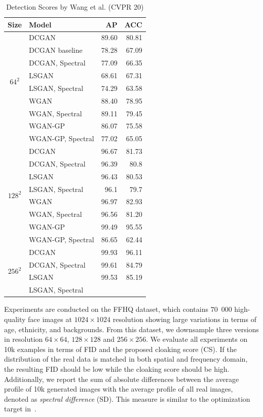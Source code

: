 \documentclass[letterpaper]{article} %
\begin{document}
\begin{table}
    \caption{Detection Scores by Wang et al. (CVPR 20)}
    \centering
    \begin{tabular}{l|l|rr}
        \toprule
        Size & Model & AP&ACC\\
        \midrule

\multicolumn{1}{c|}{\multirow{8}{*}{$64^2$}}
& DCGAN & 89.60&80.81 \\
& DCGAN baseline &78.28&67.09\\
  & DCGAN, Spectral &77.09&66.35\\
 \cline{2-4}
 & LSGAN &68.61&67.31 \\
 & LSGAN, Spectral &74.29&63.58 \\ %
 & WGAN & 88.40&78.95\\
 & WGAN, Spectral &  89.11&79.45\\ \cline{2-4}
 & WGAN-GP & 86.07&75.58\\
 & WGAN-GP, Spectral&77.02&65.05\\ \midrule
\multicolumn{1}{c|}{\multirow{8}{*}{$128^2$}} & DCGAN &96.67&81.73\\
 & DCGAN, Spectral & 96.39&80.8\\ \cline{2-4}
 & LSGAN & 96.43&80.53 \\
 & LSGAN, Spectral &96.1&79.7  \\ \cline{2-4}
 & WGAN &96.97&82.93  \\
 & WGAN, Spectral& 96.56&81.20\\ \cline{2-4}
 & WGAN-GP &99.49&95.55  \\
 & WGAN-GP, Spectral &86.65&62.44 \\\midrule
\multicolumn{1}{c|}{\multirow{4}{*}{$256^2$}} & DCGAN &99.93& 96.11\\
 & DCGAN, Spectral &99.61&84.79\\ \cline{2-4}
 & LSGAN & 99.53&85.19 \\
 & LSGAN, Spectral &  \\ \bottomrule

    \end{tabular}
\end{table}
\fi


Experiments are conducted on the FFHQ dataset, which contains $70$~$000$ high-quality face images at $1024 \times 1024$ resolution showing large variations in terms of age, ethnicity, and backgrounds.
From this dataset, we downsample three versions in resolution $64\times64$, $128\times128$ and $256\times256$.
We evaluate all experiments on 10k examples in terms of FID and the proposed cloaking score (CS). If the distribution of the real data is matched in both spatial and frequency domain, the resulting FID should be low while the cloaking score should be high. Additionally, we report the sum of absolute differences between the average profile of 10k generated images with the average profile of all real images, denoted as \textit{spectral difference} (SD).
This measure is similar to the optimization target in~\cite{margret2020upconvolution}.
\end{document}
